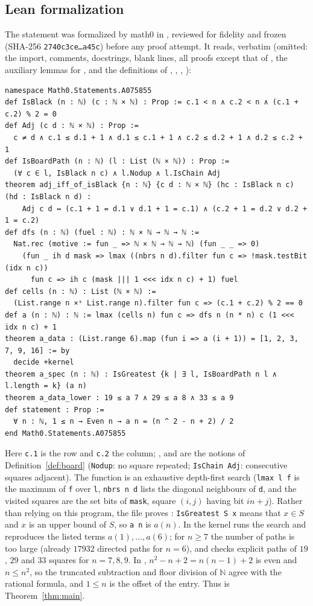 \documentclass[11pt]{amsart}
\theoremstyle{plain}
\theoremstyle{definition}
\begin{document}
\subsection*{Lean formalization}
The statement was formalized by math0 in , reviewed for fidelity and frozen (SHA-256 \texttt{2740c3ce\ldots a45c}) before any proof attempt. It reads, verbatim (omitted: the import, comments, docstrings, blank lines, all proofs except that of , the auxiliary lemmas for , and the definitions of , , , ):
\begin{lstlisting}
namespace Math0.Statements.A075855
def IsBlack (n : ℕ) (c : ℕ × ℕ) : Prop := c.1 < n ∧ c.2 < n ∧ (c.1 + c.2) % 2 = 0
def Adj (c d : ℕ × ℕ) : Prop :=
  c ≠ d ∧ c.1 ≤ d.1 + 1 ∧ d.1 ≤ c.1 + 1 ∧ c.2 ≤ d.2 + 1 ∧ d.2 ≤ c.2 + 1
def IsBoardPath (n : ℕ) (l : List (ℕ × ℕ)) : Prop :=
  (∀ c ∈ l, IsBlack n c) ∧ l.Nodup ∧ l.IsChain Adj
theorem adj_iff_of_isBlack {n : ℕ} {c d : ℕ × ℕ} (hc : IsBlack n c) (hd : IsBlack n d) :
    Adj c d ↔ (c.1 + 1 = d.1 ∨ d.1 + 1 = c.1) ∧ (c.2 + 1 = d.2 ∨ d.2 + 1 = c.2)
def dfs (n : ℕ) (fuel : ℕ) : ℕ × ℕ → ℕ → ℕ :=
  Nat.rec (motive := fun _ => ℕ × ℕ → ℕ → ℕ) (fun _ _ => 0)
    (fun _ ih d mask => lmax ((nbrs n d).filter fun c => !mask.testBit (idx n c))
      fun c => ih c (mask ||| 1 <<< idx n c) + 1) fuel
def cells (n : ℕ) : List (ℕ × ℕ) :=
  (List.range n ×ˢ List.range n).filter fun c => (c.1 + c.2) % 2 == 0
def a (n : ℕ) : ℕ := lmax (cells n) fun c => dfs n (n * n) c (1 <<< idx n c) + 1
theorem a_data : (List.range 6).map (fun i => a (i + 1)) = [1, 2, 3, 7, 9, 16] := by
  decide +kernel
theorem a_spec (n : ℕ) : IsGreatest {k | ∃ l, IsBoardPath n l ∧ l.length = k} (a n)
theorem a_data_lower : 19 ≤ a 7 ∧ 29 ≤ a 8 ∧ 33 ≤ a 9
def statement : Prop :=
  ∀ n : ℕ, 1 ≤ n → Even n → a n = (n ^ 2 - n + 2) / 2
end Math0.Statements.A075855
\end{lstlisting}
Here \texttt{c.1} is the row and \texttt{c.2} the column; ,  and  are the notions of Definition~\ref{def:board} (\texttt{Nodup}: no square repeated; \texttt{IsChain Adj}: consecutive squares adjacent). The function  is an exhaustive depth-first search (\texttt{lmax l f} is the maximum of \texttt{f} over \texttt{l}, \texttt{nbrs n d} lists the diagonal neighbours of \texttt{d}, and the visited squares are the set bits of \texttt{mask}, square $(i,j)$ having bit $in+j$). Rather than relying on this program, the file proves : \texttt{IsGreatest S x} means that $x\in S$ and $x$ is an upper bound of $S$, so \texttt{a n} is $a(n)$. In  the kernel runs the search and reproduces the listed terms $a(1),\dots,a(6)$; for $n\ge7$ the number of paths is too large (already $17932$ directed paths for $n=6$), and  checks explicit paths of $19$, $29$ and $33$ squares for $n=7,8,9$. In , $n^2-n+2=n(n-1)+2$ is even and $n\le n^2$, so the truncated subtraction and floor division of $\mathbb N$ agree with the rational formula, and $1\le n$ is the offset of the entry. Thus  is Theorem~\ref{thm:main}.
\end{document}
